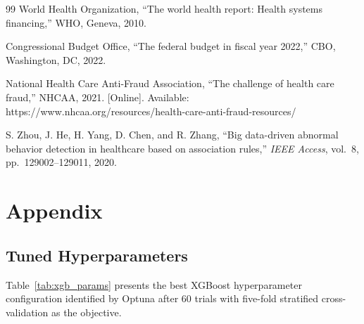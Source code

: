\begin{thebibliography}{99}
World Health Organization,
``The world health report: Health systems financing,''
WHO, Geneva, 2010.

Congressional Budget Office,
``The federal budget in fiscal year 2022,''
CBO, Washington, DC, 2022.

National Health Care Anti-Fraud Association,
``The challenge of health care fraud,'' NHCAA, 2021.
[Online]. Available: https://www.nhcaa.org/resources/health-care-anti-fraud-resources/

S. Zhou, J. He, H. Yang, D. Chen, and R. Zhang,
``Big data-driven abnormal behavior detection in healthcare based on association rules,''
\textit{IEEE Access}, vol.~8, pp.~129002--129011, 2020.

\end{thebibliography}


\appendix
\chapter{Appendix}

\section{Tuned Hyperparameters}

Table~\ref{tab:xgb_params} presents the best XGBoost hyperparameter configuration identified by Optuna after 60 trials with five-fold stratified cross-validation as the objective.

